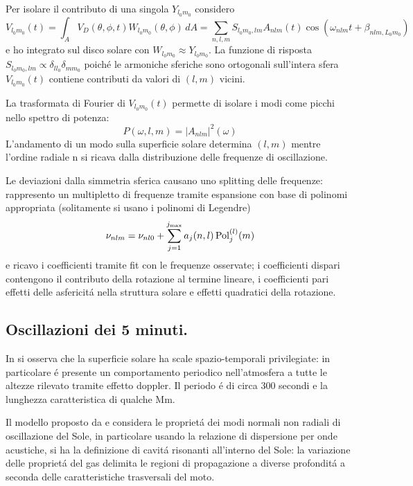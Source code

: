 \documentclass[../main.tex]{subfiles}
\begin{document}
Per isolare il contributo di una singola $Y_{l_0m_0}$ considero
\begin{equation}
V_{l_0m_0}(t)=\int_AV_D(\theta,\phi,t)W_{l_0m_0}(\theta,\phi)\,dA=\sum_{n,l,m}S_{l_0m_0,lm}A_{nlm}(t)\cos{(\omega_{nlm}t+\beta_{nlm,L_0m_0})}
\end{equation}
e ho integrato sul disco solare con $W_{l_0m_0}\approx Y_{l_0m_0}$. La funzione di risposta $S_{l_0m_0,lm}\propto\delta_{ll_0}\delta_{mm_0}$ poich\'e le armoniche sferiche sono ortogonali sull'intera sfera $V_{l_0m_0}(t)$ contiene contributi da valori di $(l,m)$ vicini.

La trasformata di Fourier di $V_{l_0m_0}(t)$ permette di isolare i modi come picchi nello spettro di potenza:
\begin{equation}
P(\omega,l,m)=|A_{nlm}|^2(\omega)
\end{equation}
L'andamento di un modo sulla superficie solare determina $(l,m)$ mentre l'ordine radiale n si ricava dalla distribuzione delle frequenze di oscillazione.

Le deviazioni dalla simmetria sferica causano uno splitting delle frequenze: rappresento un multipletto di frequenze tramite espansione con base di polinomi appropriata (solitamente si usano i polinomi di Legendre)
\begin{equation}
\nu_{nlm}=\nu_{nl0}+\sum_{j=1}^{j_{\max}}a_j(n,l)\operatorname{Pol}_j^{(l)}(m)\label{eq:freqmulti}
\end{equation}
e ricavo i coefficienti tramite fit con le frequenze osservate; i coefficienti dispari contengono il contributo della rotazione al termine lineare, i coefficienti pari effetti delle asfericit\'a nella struttura solare e effetti quadratici della rotazione.

\subsection{Oscillazioni dei 5 minuti.}

In \citet{lei62velocity} si osserva che la superficie solare ha scale spazio-temporali privilegiate: in particolare \'e presente un comportamento periodico nell'atmosfera a tutte le altezze rilevato tramite effetto doppler. Il periodo \'e di circa 300 secondi e la lunghezza caratteristica di qualche \si{\mega\meter}.

Il modello proposto da \citet{ulrich70five} e \citet*{stein71five} considera le propriet\'a dei modi normali non radiali di oscillazione del Sole, in particolare usando la relazione di dispersione per onde acustiche, si ha la definizione di cavit\'a risonanti all'interno del Sole: la variazione delle propriet\'a del gas delimita le regioni di propagazione a diverse profondit\'a a seconda delle caratteristiche trasversali del moto.
\end{document}
